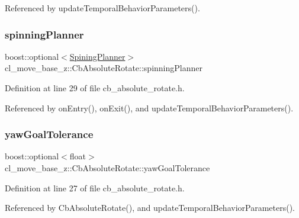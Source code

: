 Referenced by update\+Temporal\+Behavior\+Parameters().

\mbox{\label{classcl__move__base__z_1_1CbAbsoluteRotate_a17d836524599af072cf2e3488e491a91}} 
\subsubsection{\texorpdfstring{spinning\+Planner}{spinningPlanner}}
{\footnotesize\ttfamily boost\+::optional$<$\hyperlink{namespacecl__move__base__z_aab2ad3041275145f0065fb60b3299345}{Spining\+Planner}$>$ cl\+\_\+move\+\_\+base\+\_\+z\+::\+Cb\+Absolute\+Rotate\+::spinning\+Planner}



Definition at line 29 of file cb\+\_\+absolute\+\_\+rotate.\+h.



Referenced by on\+Entry(), on\+Exit(), and update\+Temporal\+Behavior\+Parameters().

\mbox{\label{classcl__move__base__z_1_1CbAbsoluteRotate_a8d8b5b9c2c821efe101bb07c96c4bdd3}} 
\subsubsection{\texorpdfstring{yaw\+Goal\+Tolerance}{yawGoalTolerance}}
{\footnotesize\ttfamily boost\+::optional$<$float$>$ cl\+\_\+move\+\_\+base\+\_\+z\+::\+Cb\+Absolute\+Rotate\+::yaw\+Goal\+Tolerance}



Definition at line 27 of file cb\+\_\+absolute\+\_\+rotate.\+h.



Referenced by Cb\+Absolute\+Rotate(), and update\+Temporal\+Behavior\+Parameters().



